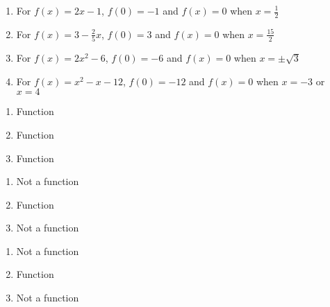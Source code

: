 \begin{enumerate}
\setcounter{enumi}{\value{HW}}

\item For $f(x) = 2x-1$,  $f(0) = -1$ and $f(x) = 0$ when $x = \frac{1}{2}$

\item For $f(x) =  3 - \frac{2}{5} x$, $f(0) = 3$ and $f(x) = 0$ when $x = \frac{15}{2}$

\item For $f(x) =  2x^2-6$, $f(0) = -6$ and $f(x) = 0$ when $x = \pm \sqrt{3}$

\item For $f(x) =  x^2-x-12$, $f(0) = -12$ and $f(x) = 0$ when $x = -3$ or $x=4$


\setcounter{HW}{\value{enumi}}
\end{enumerate}

\begin{multicols}{3}
\begin{enumerate}
\setcounter{enumi}{\value{HW}}


\item Function
\item Function
\item Function

\setcounter{HW}{\value{enumi}}
\end{enumerate}
\end{multicols}

\begin{multicols}{3}
\begin{enumerate}
\setcounter{enumi}{\value{HW}}


\item Not a function
\item Function
\item Not a function

\setcounter{HW}{\value{enumi}}
\end{enumerate}
\end{multicols}

\begin{multicols}{3}
\begin{enumerate}
\setcounter{enumi}{\value{HW}}

\item  Not a function
\item  Function
\item  Not a function

\setcounter{HW}{\value{enumi}}
\end{enumerate}
\end{multicols}

